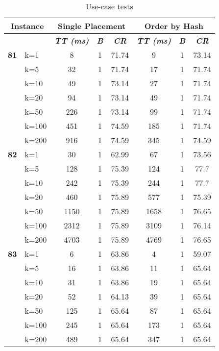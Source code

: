     \begin{table}[htbp]
    \caption{Use-case tests}
    \begin{tabular}{|l|l|c|c|c|c|c|c|}
    
    \multicolumn{ 2}{|c|}{\textbf{Instance}} & \multicolumn{ 3}{c|}{\textbf{Single Placement}} & \multicolumn{ 3}{c|}{\textbf{Order by Hash}} \\ \hline
    \multicolumn{ 2}{|l|}{} & \textbf{\textit{TT (ms)}} & \textbf{\textit{B}} & \textbf{\textit{CR}} & \textbf{\textit{TT (ms)}} & \textbf{\textit{B}} & \textbf{\textit{CR}} \\ \hline
    \multicolumn{1}{|r|}{\textbf{81}} & k=1 & 8 & 1 & 71.74 & 9 & 1 & 73.14 \\ 
     & k=5 & 32 & 1 & 71.74 & 17 & 1 & 71.74 \\ 
     & k=10 & 49 & 1 & 73.14 & 27 & 1 & 71.74 \\ 
     & k=20 & 94 & 1 & 73.14 & 49 & 1 & 71.74 \\ 
     & k=50 & 226 & 1 & 73.14 & 99 & 1 & 71.74 \\ 
     & k=100 & 451 & 1 & 74.59 & 185 & 1 & 71.74 \\ 
     & k=200 & 916 & 1 & 74.59 & 345 & 1 & 74.59 \\ \hline
    \multicolumn{1}{|r|}{\textbf{82}} & k=1 & 30 & 1 & 62.99 & 67 & 1 & 73.56 \\ 
     & k=5 & 128 & 1 & 75.39 & 124 & 1 & 77.7 \\ 
     & k=10 & 242 & 1 & 75.39 & 244 & 1 & 77.7 \\ 
     & k=20 & 460 & 1 & 75.89 & 577 & 1 & 75.39 \\ 
     & k=50 & 1150 & 1 & 75.89 & 1658 & 1 & 76.65 \\ 
     & k=100 & 2312 & 1 & 75.89 & 3109 & 1 & 76.14 \\ 
     & k=200 & 4703 & 1 & 75.89 & 4769 & 1 & 76.65 \\ \hline
    \multicolumn{1}{|r|}{\textbf{83}} & k=1 & 6 & 1 & 63.86 & 4 & 1 & 59.07 \\ 
     & k=5 & 16 & 1 & 63.86 & 11 & 1 & 65.64 \\ 
     & k=10 & 31 & 1 & 63.86 & 19 & 1 & 65.64 \\ 
     & k=20 & 52 & 1 & 64.13 & 39 & 1 & 65.64 \\ 
     & k=50 & 125 & 1 & 65.64 & 87 & 1 & 65.64 \\ 
     & k=100 & 245 & 1 & 65.64 & 173 & 1 & 65.64 \\ 
     & k=200 & 489 & 1 & 65.64 & 347 & 1 & 65.64 \\ \hline

\end{tabular}
\end{table}
